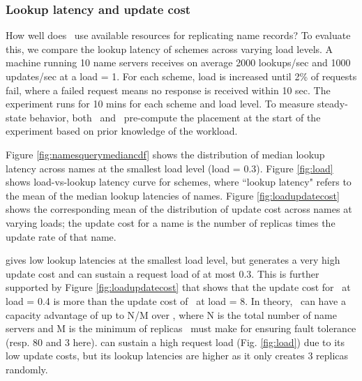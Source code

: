 \vsp
\subsubsection{Lookup latency and update cost}
\label{sec:lookup}
\label{sec:lowload}


How well does \auspice\ use available resources for replicating name records? To evaluate this, we compare the lookup latency of schemes across varying load levels. A machine running 10 name servers receives on average 2000 lookups/sec and 1000 updates/sec at a load = 1. For each scheme, load is increased  until  2\% of requests fail, where a failed request means no response is received within 10 sec. The experiment runs for 10 mins for each scheme and load level. To measure steady-state behavior, both \auspice\ and \codons\ pre-compute the placement at the start of the experiment based on prior knowledge of the workload.%

Figure \ref{fig:namesquerymediancdf} shows the distribution of median lookup latency across names at the smallest load level (load = 0.3).  Figure \ref{fig:load} shows load-vs-lookup latency curve for schemes, where ``lookup latency" refers to the mean of the median lookup latencies of names. Figure \ref{fig:loadupdatecost} shows the corresponding mean of the distribution of update cost across names at varying loads; the update cost for a name is the number of replicas times the update rate of that name.


{\em{\replicateall}}   gives low lookup latencies at the smallest load level, but generates a very high update cost and can sustain a request load of at most 0.3. This is further supported by  Figure \ref{fig:loadupdatecost} that shows that the update cost for \replicateall\ at load = 0.4 is more than the update cost of \auspice\  at load = 8. In theory, \auspice\ can have a capacity advantage of up to N/M over \replicateall, where N is the total number of name servers and M is the minimum of replicas \auspice\ must make for ensuring fault tolerance (resp. 80 and 3 here). {\em{\staticthree}} can sustain a high request load (Fig. \ref{fig:load}) due to its low update costs, but its lookup latencies are higher as it only creates 3 replicas randomly. %

